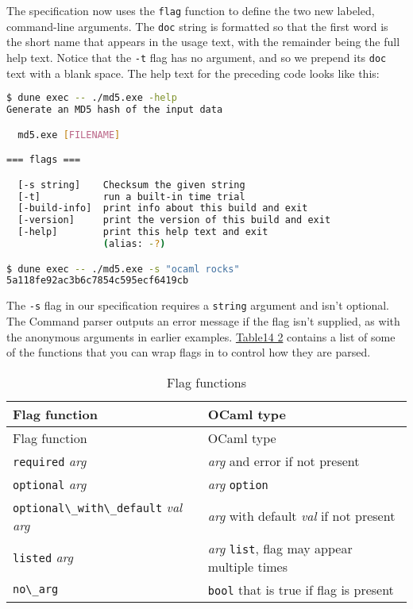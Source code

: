 The specification now uses the \passthrough{\lstinline!flag!} function
to define the two new labeled, command-line arguments. The
\passthrough{\lstinline!doc!} string is formatted so that the first word
is the short name that appears in the usage text, with the remainder
being the full help text. Notice that the \passthrough{\lstinline!-t!}
flag has no argument, and so we prepend its
\passthrough{\lstinline!doc!} text with a blank space. The help text for
the preceding code looks like this:

\begin{lstlisting}[language=bash]
$ dune exec -- ./md5.exe -help
Generate an MD5 hash of the input data

  md5.exe [FILENAME]

=== flags ===

  [-s string]    Checksum the given string
  [-t]           run a built-in time trial
  [-build-info]  print info about this build and exit
  [-version]     print the version of this build and exit
  [-help]        print this help text and exit
                 (alias: -?)

$ dune exec -- ./md5.exe -s "ocaml rocks"
5a118fe92ac3b6c7854c595ecf6419cb
\end{lstlisting}

The \passthrough{\lstinline!-s!} flag in our specification requires a
\passthrough{\lstinline!string!} argument and isn't optional. The
Command parser outputs an error message if the flag isn't supplied, as
with the anonymous arguments in earlier examples.
\href{command-line-parsing.html\#table14-2}{Table14 2} contains a list
of some of the functions that you can wrap flags in to control how they
are parsed. 

\hypertarget{table14-2}{}
\begin{longtable}[]{@{}ll@{}}
\caption{Flag functions}\tabularnewline
\toprule
Flag function & OCaml type\tabularnewline
\midrule
\endfirsthead
\toprule
Flag function & OCaml type\tabularnewline
\midrule
\endhead
\passthrough{\lstinline!required!} \emph{arg} & \emph{arg} and error if
not present\tabularnewline
\passthrough{\lstinline!optional!} \emph{arg} & \emph{arg}
\passthrough{\lstinline!option!}\tabularnewline
\passthrough{\lstinline!optional\_with\_default!} \emph{val} \emph{arg}
& \emph{arg} with default \emph{val} if not present\tabularnewline
\passthrough{\lstinline!listed!} \emph{arg} & \emph{arg}
\passthrough{\lstinline!list!}, flag may appear multiple
times\tabularnewline
\passthrough{\lstinline!no\_arg!} & \passthrough{\lstinline!bool!} that
is true if flag is present\tabularnewline
\bottomrule
\end{longtable}

